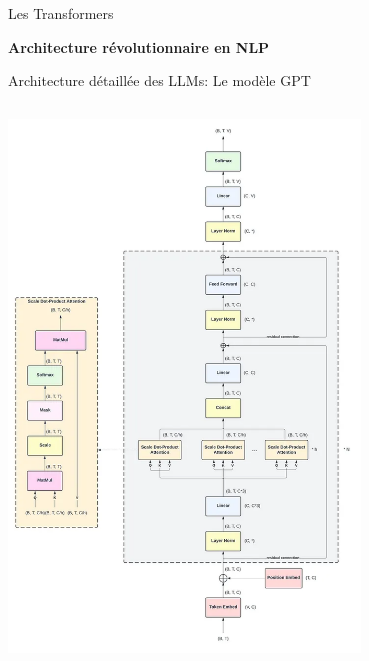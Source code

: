 \documentclass[aspectratio=169]{beamer}
\begin{document}
\begin{frame}{Les Transformers}
    \begin{center}
        \Large{\textbf{Architecture révolutionnaire en NLP}}
        
        \vspace{1cm}
        
    \end{center}
\end{frame}

\begin{frame}{Architecture détaillée des LLMs: Le modèle GPT}
    \begin{columns}
        \begin{column}{0.4\textwidth}
            \begin{center}
                \includegraphics[width=0.7\textwidth]{images/gpt2.png}
                                

\end{center}
\end{column}
\end{columns}
\end{frame}
\end{document}
